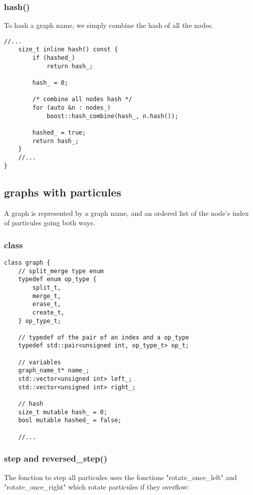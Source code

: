 \documentclass[11pt]{article}
\begin{document}
\subsubsection{hash()}

To hash a graph name, we simply combine the hash of all the nodes.

\begin{lstlisting}[style=CStyle]
	//...
	size_t inline hash() const {
		if (hashed_)
			return hash_;

		hash_ = 0;

		/* combine all nodes hash */
		for (auto &n : nodes_)
			boost::hash_combine(hash_, n.hash());

		hashed_ = true;
		return hash_;
	}
	//...
}
\end{lstlisting}

\subsection{graphs with particules}

A graph is represented by a graph name, and an ordered list of the node's index of particules going both ways.

\subsubsection{class}

\begin{lstlisting}[style=CStyle]
class graph {
	// split_merge type enum 
  	typedef enum op_type {
		split_t,
		merge_t,
		erase_t,
		create_t,
	} op_type_t;

	// typedef of the pair of an index and a op_type 
  	typedef std::pair<unsigned int, op_type_t> op_t;
  	
	// variables 
	graph_name_t* name_;
	std::vector<unsigned int> left_;
	std::vector<unsigned int> right_;

	// hash
	size_t mutable hash_ = 0;
	bool mutable hashed_ = false;

	//...
\end{lstlisting}

\subsubsection{step and reversed\_step()}

The fonction to step all particules uses the fonctions "rotate\_once\_left" and "rotate\_once\_right" which rotate particules if they overflow:
\end{document}
